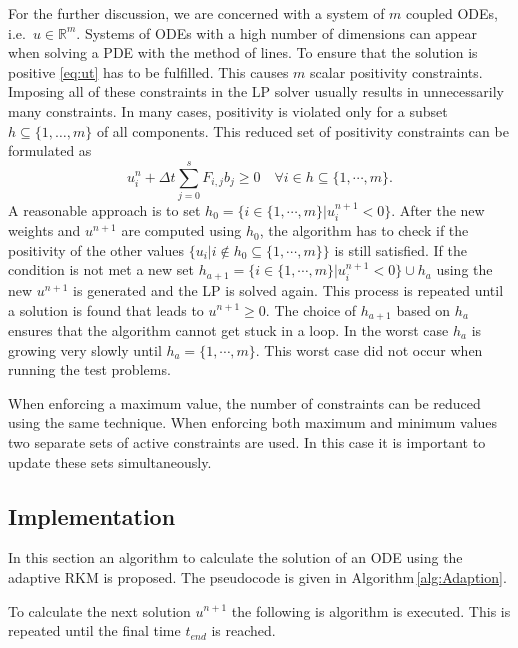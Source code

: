\documentclass[a4paper]{article}
\numberwithin{equation}{section}
\theoremstyle{plain}
\theoremstyle{definition}
\numberwithin{theorem}{section}
\newcommand{\R}{\mathbb{R}}
\newcommand{\dt}{{\Delta t}}
\newcommand{\1}{\mathbbm{1}}
\begin{document}
For the further discussion, we are concerned with a system of
$m$ coupled ODEs, i.e.\ $u \in \R^m$.
Systems of ODEs with a high number of dimensions can appear when solving a PDE with the method of lines.
To ensure that the solution is positive \eqref{eq:ut} has to be fulfilled. 
This causes $m$ scalar positivity constraints.
Imposing all of these constraints in the LP solver usually results
in unnecessarily many constraints. In many cases, positivity is
violated only for a subset $h \subseteq \{1, \dots, m\}$ of all
components. This reduced set of positivity constraints can be
formulated as
\begin{equation}
u_i^n + \dt \sum_{j=0}^s F_{i,j}  b_j  \geq 0 \quad \forall i \in h \subseteq \{1,\cdots,m \}.
\end{equation}
A reasonable approach is to set $h_0 = \{ i \in \{1,\cdots,m \} |  u_i^{n+1}  < 0 \}$. 
After the new weights and $u^{n+1}$ are computed using $h_0$, the algorithm has to check if the positivity of the other values $\{u_i | i \notin h_0 \subseteq \{1,\cdots,m \}\}$ is still satisfied.
If the condition is not met a new set $h_{a+1} = \{ i \in \{1,\cdots,m \}|  u_i^{n+1}  < 0 \} \cup h_{a}$ using the new $u^{n+1}$ is generated and the LP is solved again. This process is repeated until a solution is found that leads to $u^{n+1} \geq 0$. The choice of $h_{a+1}$ based on $h_{a}$ ensures that the algorithm cannot get stuck in a loop. In the worst case $h_a$ is growing very slowly until $h_a = \{1,\cdots,m \}$.
This worst case did not occur when running the test problems.

When enforcing a maximum value, the number of constraints can be reduced using the same technique. When enforcing both maximum and minimum values two separate sets of active constraints are used. 
In this case it is important to update these sets simultaneously.  

\subsection{Implementation}

In this section an algorithm to calculate the solution of an ODE using the adaptive RKM is proposed.
The pseudocode is given in Algorithm\,\ref{alg:Adaption}.

To calculate the next solution $u^{n+1}$ the following is algorithm is executed. This is repeated until the final time $t_{end}$ is reached.
\end{document}
